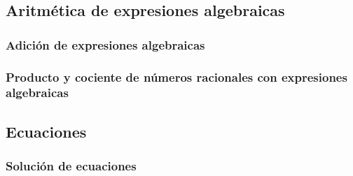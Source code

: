 \documentclass[12pt]{book}
\begin{document}
\begin{mainmatter}
    \subsection{Aritmética de expresiones algebraicas}
    \subsubsection{Adición de expresiones algebraicas}
    \subsubsection{Producto y cociente de números racionales con expresiones algebraicas}
    \subsection{Ecuaciones}
    \subsubsection{Solución de ecuaciones}





\end{mainmatter}
\end{document}
